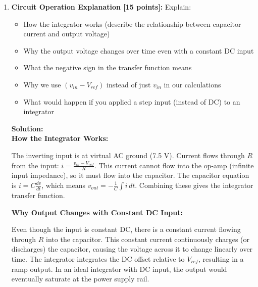 \documentclass[11pt]{article}
\newenvironment{solution}
    {\color{blue}\textbf{Solution:}\\}
    {}
\begin{document}
\begin{enumerate}[label=\textbf{2.\arabic*}]
\begin{solution}
\textbf{At $t = 0.1$ s:}
\begin{align*}
v_{out}(0.1) = -15(0.1) + 7.5 = -1.5 + 7.5 = 6.0\text{ V}
\end{align*}

\textbf{Time to reach 5.0 V:}
\begin{align*}
5.0 &= -15t + 7.5\\
15t &= 2.5\\
t &= \frac{2.5}{15} = 0.167\text{ s} = 167\text{ ms}
\end{align*}
\end{solution}

\vspace{1cm}
    
    \item \textbf{Circuit Operation Explanation [15 points]:} Explain:
    \begin{itemize}
        \item How the integrator works (describe the relationship between capacitor current and output voltage)
        \item Why the output voltage changes over time even with a constant DC input
        \item What the negative sign in the transfer function means
        \item Why we use $(v_{in} - V_{ref})$ instead of just $v_{in}$ in our calculations
        \item What would happen if you applied a step input (instead of DC) to an integrator
    \end{itemize}
    
\begin{solution}
\textbf{How the Integrator Works:}

The inverting input is at virtual AC ground (7.5 V). Current flows through $R$ from the input: $i = \frac{v_{in} - V_{ref}}{R}$. This current cannot flow into the op-amp (infinite input impedance), so it must flow into the capacitor. The capacitor equation is $i = C \frac{dv}{dt}$, which means $v_{out} = -\frac{1}{C}\int i \, dt$. Combining these gives the integrator transfer function.

\textbf{Why Output Changes with Constant DC Input:}

Even though the input is constant DC, there is a constant current flowing through $R$ into the capacitor. This constant current continuously charges (or discharges) the capacitor, causing the voltage across it to change linearly over time. The integrator integrates the DC offset relative to $V_{ref}$, resulting in a ramp output. In an ideal integrator with DC input, the output would eventually saturate at the power supply rail.


\end{solution}
\end{enumerate}
\end{document}

